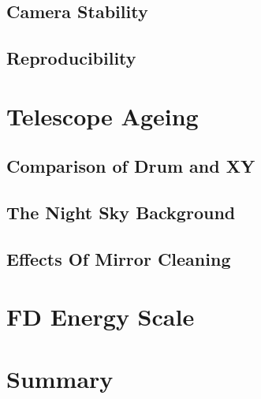 \subsection{Camera Stability}
\subsection{Reproducibility}

\section{Telescope Ageing}
\label{sec:telescope-aging}


\subsection{Comparison of Drum and XY}
\subsection{The Night Sky Background}
\subsection{Effects Of Mirror Cleaning}

\section{FD Energy Scale}
\label{sec:fd-energy-scale}


\section{Summary}
